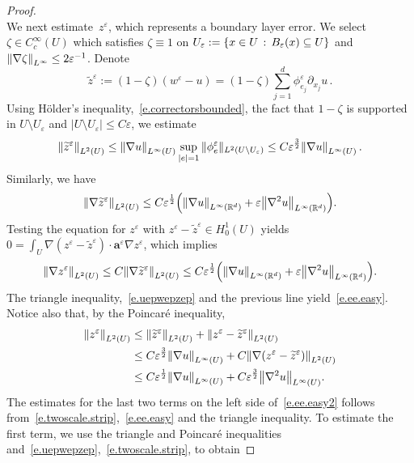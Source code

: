 \documentclass[11pt]{article} %
\numberwithin{equation}{section}
\theoremstyle{definition}
\let\originalleft\left
\let\originalright\right
\renewcommand{\left}{\mathopen{}\mathclose\bgroup\originalleft}
\renewcommand{\right}{\aftergroup\egroup\originalright}
\newcommand*{\Rd}{\ensuremath{\mathbb{R}^d}}
\newcommand{\eps}{\varepsilon}
\renewcommand*{\tilde}{\widetilde}
\newcommand{\ep}{\eps}
\renewcommand{\a}{\mathbf{a}}
\begin{document}
\begin{proof}
\begin{equation}
\end{equation}
We next estimate~$z^\ep$, which represents a boundary layer error. 
We select~$\zeta\in C^\infty_c(U)$ which satisfies $\zeta \equiv 1$ on $U_{\ep}:= \left\{ x\in U\,:\, B_\ep(x) \subseteq U \right\}$ and $\left\| \nabla \zeta \right\|_{L^\infty} \leq 2\ep^{-1}$.
Denote
\begin{equation*}
\tilde{z}^\ep
:= 
(1-\zeta)(w^\ep-u) 
= 
(1-\zeta) \sum_{j=1}^d \phi_{e_j}^\ep  \partial_{x_j}u \,.
\end{equation*}
Using H\"older's inequality,~\eqref{e.correctorsbounded}, the fact that $1-\zeta$ is supported in $U \setminus U_\ep$ and $|U\setminus U_\ep| \leq C\ep$, we estimate
\begin{equation*}
\left\| \tilde{z}^\ep \right\|_{L^2(U)} 
\leq 
\left\| \nabla u \right\|_{L^\infty(U)} 
\sup_{|e| =1} \| \phi^\ep_e \|_{L^2(U\setminus U_\ep)}
\leq
C\ep^{\frac32} \left\| \nabla u \right\|_{L^\infty(U)}
\,.
\end{equation*}
Similarly, we have
\begin{equation*}
\left\| \nabla \tilde{z}^\ep \right\|_{{L}^2(U)} 
\leq 
C\ep^{\frac12} \left( \left\| \nabla u \right\|_{L^\infty(\Rd)} 
+
\ep \left\| \nabla^2 u \right\|_{L^\infty(\Rd)} \right). 
\end{equation*}
Testing the equation for $z^\ep$ with $z^\ep - \tilde{z}^\ep \in H^1_0(U)$ yields
$0 = \int_U \nabla (z^\ep - \tilde{z}^\ep) \cdot \a^\ep \nabla z^\ep$, 
which implies 
\begin{equation*}
\left\| \nabla z^\ep \right\|_{{L}^2(U)} 
\leq
C\left\| \nabla \tilde{z}^\ep \right\|_{{L}^2(U)}
\leq 
C\ep^{\frac12} \left( \left\| \nabla u \right\|_{L^\infty(\Rd)} 
+
\ep \left\| \nabla^2 u \right\|_{L^\infty(\Rd)} \right).
\end{equation*}
The triangle inequality,~\eqref{e.uepwepzep} and the previous line yield~\eqref{e.ee.easy}. Notice also that, by the Poincar\'e inequality, 
\begin{align}
\label{e.crude}
\left\| z^\ep\right\|_{L^2(U)}
&
\leq 
\left\| \tilde{z}^\ep \right\|_{L^2(U)} 
+ \left\| z^\ep - \tilde{z}^\ep\right\|_{L^2(U)}
\notag \\ & 
\leq C\ep^{\frac32} \left\| \nabla u \right\|_{L^\infty(U)}
+ C \left\| \nabla (z^\ep - \tilde{z}^\ep)\right\|_{L^2(U)}
\notag \\ &  
\leq
C\ep^{\frac12} \left\| \nabla u \right\|_{L^\infty(U)} 
+
C\ep^{\frac 32} \left\| \nabla^2 u \right\|_{L^\infty(U)}.
\end{align}
The estimates for the last two terms on the left side of~\eqref{e.ee.easy2} follows from~\eqref{e.twoscale.strip},~\eqref{e.ee.easy} and the triangle inequality. To estimate the first term, we use the triangle and Poincar\'e inequalities and~\eqref{e.uepwepzep},~\eqref{e.twoscale.strip}, to obtain

\end{proof}
\end{document}
